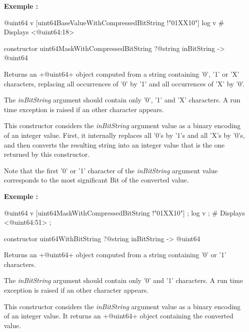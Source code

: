 \textbf{Exemple :}
\begin{galgas3}
@uint64 v [uint64BaseValueWithCompressedBitString !"01XX10"]
log v # Displays <@uint64:18>
\end{galgas3}






\begin{galgas3}
constructor uint64MaskWithCompressedBitString ?@string inBitString -> @uint64
\end{galgas3}


Returns an \ggst+@uint64+ object computed from a string containing '0', '1' or 'X' characters, replacing all occurrences of '0' by '1' and all occurrences of 'X' by '0'.

The \emph{inBitString} argument should contain only '0', '1' and 'X' characters. A run time exception is raised if an other character appears.

This constructor considers the \emph{inBitString} argument value as a binary encoding of an integer value. First, it internally replaces all '0's by '1's and all 'X's by '0's, and then converts the resulting string into an integer value that is the one returned by this constructor.

Note that the first '0' or '1' character of the \emph{inBitString} argument value corresponds to the most significant Bit of the converted value.

\textbf{Exemple :}
\begin{galgas3}
@uint64 v [uint64MaskWithCompressedBitString !"01XX10"] ;
log v ; # Displays <@uint64:51> ;
\end{galgas3}




\begin{galgas3}
constructor uint64WithBitString ?@string inBitString -> @uint64
\end{galgas3}


Returns an \ggst+@uint64+ object computed from a string containing '0' or '1' characters.

The \emph{inBitString} argument should contain only '0' and '1' characters. A run time exception is raised if an other character appears.

This constructor considers the \emph{inBitString} argument value as a binary encoding of an integer value. It returns an \ggst+@uint64+ object containing the converted value.

